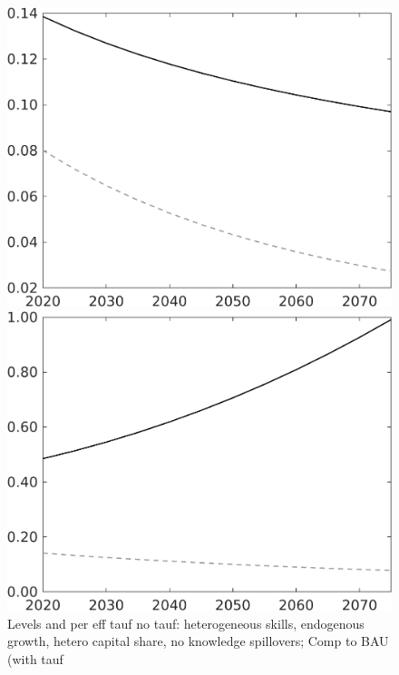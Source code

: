 \documentclass[12pt]{article}
\begin{document}
\begin{figure}
	\centering
	\caption{Levels and per eff tauf no tauf: heterogeneous skills, endogenous growth, hetero capital share, no knowledge spillovers; Comp to BAU (with tauf}\label{fig:Leveltauf_nsk0_xgr0_noknow_withtaul2}
	
	\begin{minipage}[]{0.32\textwidth}
		\includegraphics[width=1\textwidth]{../../codding_model/own_basedOnFried/optimalPol_010922_revision/figures/all_13Sept22/LevTaufNoTauf_TaulCalib_regime0_pepn_spillover0_nsk0_xgr0_knspil1_sep1_LFlimit0_emsbase0_countec0_GovRev0_etaa0.79_lgd0.png}
	\end{minipage}	
	\begin{minipage}[]{0.32\textwidth}
		\includegraphics[width=1\textwidth]{../../codding_model/own_basedOnFried/optimalPol_010922_revision/figures/all_13Sept22/LevTaufNoTauf_TaulCalib_regime0_LgLf_spillover0_nsk0_xgr0_knspil1_sep1_LFlimit0_emsbase0_countec0_GovRev0_etaa0.79_lgd0.png}

\end{minipage}
\end{figure}
\end{document}
